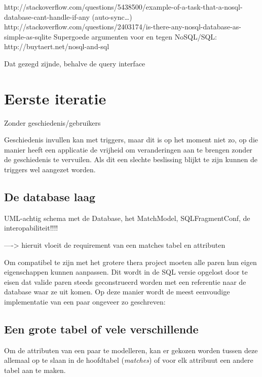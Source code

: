 http://stackoverflow.com/questions/5438500/example-of-a-task-that-a-nosql-database-cant-handle-if-any (auto-sync\ldots)
http://stackoverflow.com/questions/2403174/is-there-any-nosql-database-as-simple-as-sqlite
Supergoede argumenten voor en tegen NoSQL/SQL: http://buytaert.net/nosql-and-sql

Dat gezegd zijnde, behalve de query interface

\section{Eerste iteratie}

Zonder geschiedenis/gebruikers

Geschiedenis invullen kan met triggers, maar dit is op het moment niet zo, op die manier heeft een applicatie de vrijheid om veranderingen aan te brengen zonder de geschiedenis te vervuilen. Als dit een slechte beslissing blijkt te zijn kunnen de triggers wel aangezet worden.

\subsection{De database laag}

UML-achtig schema met de Database, het MatchModel, SQLFragmentConf, de interopabiliteit!!!!

----> hieruit vloeit de requirement van een matches tabel en attributen

Om compatibel te zijn met het grotere thera project moeten alle paren hun eigen eigenschappen kunnen aanpassen. Dit wordt in de SQL versie opgelost door te eisen dat valide paren steeds geconstrueerd worden met een referentie naar de database waar ze uit komen. Op deze manier wordt de meest eenvoudige implementatie van een paar ongeveer zo geschreven:



\subsection{Een grote tabel of vele verschillende}

Om de attributen van een paar te modelleren, kan er gekozen worden tussen deze allemaal op te slaan in de hoofdtabel (\emph{matches}) of voor elk attribuut een andere tabel aan te maken.

